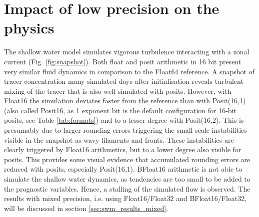 \section{Impact of low precision on the physics}
\label{sec:swm_physics}

The shallow water model simulates vigorous turbulence interacting with a zonal current (Fig. \ref{fig:snapshot}). Both float and
posit arithmetic in 16 bit present very similar fluid dynamics in comparison to the Float64 reference. A snapshot of tracer
concentration many simulated days after initialisation reveals turbulent mixing of the tracer that is also well simulated with posits.
However, with Float16 the simulation deviates faster from the reference than with Posit(16,1) (also called Posit16, as 1 exponent
bit is the default configuration for 16-bit posits, see Table \ref{tab:formats}) and to a lesser degree with Posit(16,2).
This is  presumably due to larger rounding errors triggering the small scale instabilities visible in the snapshot as wavy
filaments and fronts. These instabilities are clearly triggered by Float16 arithmetics, but to a lower degree also visible for posits.
This provides some visual evidence that accumulated rounding errors are reduced with posits, especially Posit(16,1). BFloat16
arithmetic is not able to simulate the shallow water dynamics, as tendencies are too small to be added to the prognostic variables. 
Hence, a stalling of the simulated flow is observed. The results with mixed precision, i.e. using Float16/Float32 and BFloat16/Float32,
will be discussed in section \ref{sec:swm_results_mixed}.

